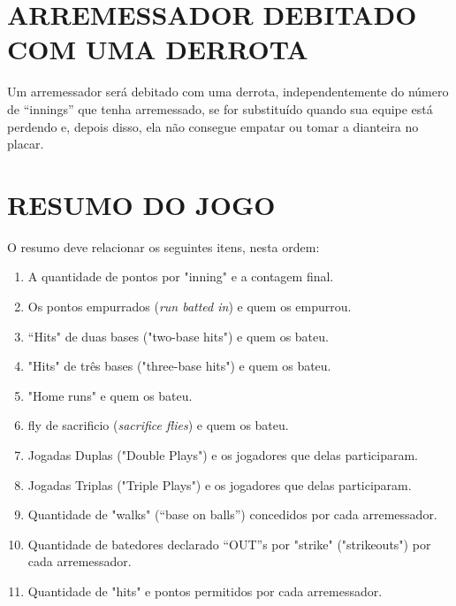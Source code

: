 \section{ARREMESSADOR DEBITADO COM UMA DERROTA }
\begin{multicols}{2} 
	Um arremessador será debitado com uma derrota, independentemente do número de 
	“innings” que tenha arremessado, se for substituído quando sua equipe está perdendo 
	e, depois disso, ela não consegue empatar ou tomar a dianteira no placar. 
\end{multicols}
\section{RESUMO DO JOGO }
\begin{multicols}{2} 
	O resumo deve relacionar os seguintes itens, nesta ordem: 
	
	\begin{enumerate}[label=\alph*)]
		\item A quantidade de pontos por "inning" e a contagem final. 
		
		\item  Os pontos empurrados (\textit{run batted in}) e quem os empurrou. 
		
		\item  “Hits" de duas bases ("two-base hits") e quem os bateu. 
		
		\item  "Hits" de três bases ("three-base hits") e quem os bateu. 
		
		\item  "Home runs" e quem os bateu. 
		
		\item  \Gls{fly de sacrificio} (\textit{sacrifice flies}) e quem os bateu. 
		
		\item  Jogadas Duplas ("Double Plays") e os jogadores que delas participaram. 
		
		\item  Jogadas Triplas ("Triple Plays") e os jogadores que delas participaram. 
		
		\item  Quantidade de "walks" (“base on balls”) concedidos por cada arremessador.
		\item Quantidade de batedores declarado “OUT”s por "strike" ("strikeouts") por cada 
		arremessador. 
		
		\item  Quantidade de "hits" e pontos permitidos por cada arremessador. 
		

\end{enumerate}
\end{multicols}
